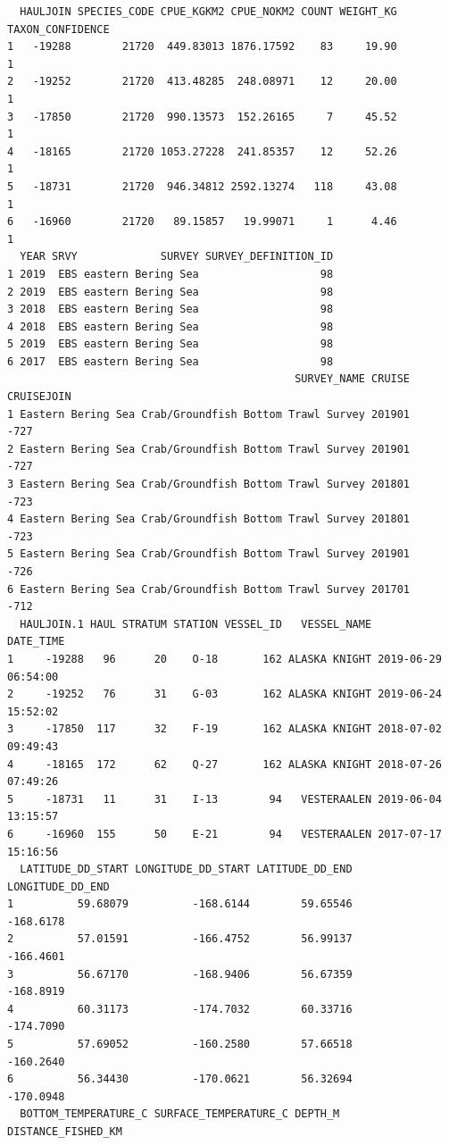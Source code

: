 \documentclass[
  letterpaper,
  oneside,
  open=any]{scrbook}
\begin{document}
\begin{verbatim}
  HAULJOIN SPECIES_CODE CPUE_KGKM2 CPUE_NOKM2 COUNT WEIGHT_KG TAXON_CONFIDENCE
1   -19288        21720  449.83013 1876.17592    83     19.90                1
2   -19252        21720  413.48285  248.08971    12     20.00                1
3   -17850        21720  990.13573  152.26165     7     45.52                1
4   -18165        21720 1053.27228  241.85357    12     52.26                1
5   -18731        21720  946.34812 2592.13274   118     43.08                1
6   -16960        21720   89.15857   19.99071     1      4.46                1
  YEAR SRVY             SURVEY SURVEY_DEFINITION_ID
1 2019  EBS eastern Bering Sea                   98
2 2019  EBS eastern Bering Sea                   98
3 2018  EBS eastern Bering Sea                   98
4 2018  EBS eastern Bering Sea                   98
5 2019  EBS eastern Bering Sea                   98
6 2017  EBS eastern Bering Sea                   98
                                             SURVEY_NAME CRUISE CRUISEJOIN
1 Eastern Bering Sea Crab/Groundfish Bottom Trawl Survey 201901       -727
2 Eastern Bering Sea Crab/Groundfish Bottom Trawl Survey 201901       -727
3 Eastern Bering Sea Crab/Groundfish Bottom Trawl Survey 201801       -723
4 Eastern Bering Sea Crab/Groundfish Bottom Trawl Survey 201801       -723
5 Eastern Bering Sea Crab/Groundfish Bottom Trawl Survey 201901       -726
6 Eastern Bering Sea Crab/Groundfish Bottom Trawl Survey 201701       -712
  HAULJOIN.1 HAUL STRATUM STATION VESSEL_ID   VESSEL_NAME           DATE_TIME
1     -19288   96      20    O-18       162 ALASKA KNIGHT 2019-06-29 06:54:00
2     -19252   76      31    G-03       162 ALASKA KNIGHT 2019-06-24 15:52:02
3     -17850  117      32    F-19       162 ALASKA KNIGHT 2018-07-02 09:49:43
4     -18165  172      62    Q-27       162 ALASKA KNIGHT 2018-07-26 07:49:26
5     -18731   11      31    I-13        94   VESTERAALEN 2019-06-04 13:15:57
6     -16960  155      50    E-21        94   VESTERAALEN 2017-07-17 15:16:56
  LATITUDE_DD_START LONGITUDE_DD_START LATITUDE_DD_END LONGITUDE_DD_END
1          59.68079          -168.6144        59.65546        -168.6178
2          57.01591          -166.4752        56.99137        -166.4601
3          56.67170          -168.9406        56.67359        -168.8919
4          60.31173          -174.7032        60.33716        -174.7090
5          57.69052          -160.2580        57.66518        -160.2640
6          56.34430          -170.0621        56.32694        -170.0948
  BOTTOM_TEMPERATURE_C SURFACE_TEMPERATURE_C DEPTH_M DISTANCE_FISHED_KM

\end{verbatim}
\end{document}
